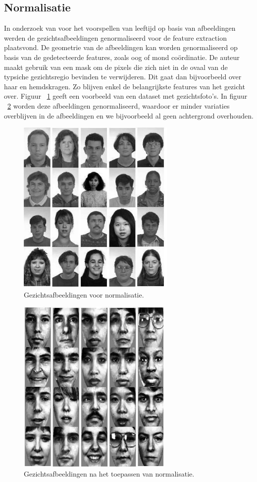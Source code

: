 \subsection{Normalisatie}\label{sub:normalisatie}
In onderzoek van \autocite{Chen2011} voor het voorspellen van leeftijd op basis van afbeeldingen werden de gezichtsafbeeldingen genormaliseerd voor de feature extraction plaatsvond. De geometrie van de afbeeldingen kan worden genormaliseerd op basis van de gedetecteerde features, zoals oog of mond coördinatie. De auteur maakt gebruik van een mask om de pixels die zich niet in de ovaal van de typsiche gezichtsregio bevinden te verwijderen. Dit gaat dan bijvoorbeeld over haar en hemdskragen. Zo blijven enkel de belangrijkste features van het gezicht over. Figuur {~\ref{fig:beforenormalisation}} geeft een voorbeeld van een dataset met gezichtsfoto's. In figuur {~\ref{fig:afternormalisation}} worden deze afbeeldingen genormaliseerd, waardoor er minder variaties overblijven in de afbeeldingen en we bijvoorbeeld al geen achtergrond overhouden.
\begin{figure}
    \centering
    \includegraphics{graphics/beforenorm.PNG}
    \caption[Gezichtsafbeeldingen voor normalisatie]{\label{fig:beforenormalisation}Gezichtsafbeeldingen voor normalisatie\autocite{Chen2011}.}
\end{figure}
\begin{figure}
    \centering
    \includegraphics{graphics/afternorm.PNG}
    \caption[Gezichtsafbeeldingen na normalisatie]{\label{fig:afternormalisation}Gezichtsafbeeldingen na het toepassen van normalisatie\autocite{Chen2011}.}
\end{figure}  \\
